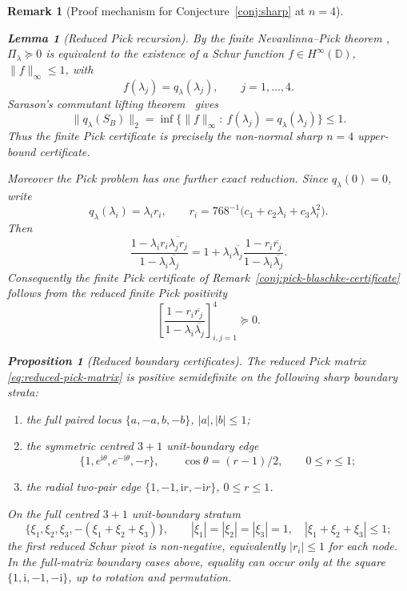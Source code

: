\documentclass[11pt]{article}
\newtheorem{proposition}[theorem]{Proposition}
\newtheorem{lemma}[theorem]{Lemma}
\newtheorem{remark}[theorem]{Remark}
\numberwithin{equation}{section}
\newcommand{\bbD}{\mathbb D}
\newcommand{\ii}{\mathrm i}
\begin{document}
\begin{remark}[Proof mechanism for Conjecture~\ref{conj:sharp} at $n=4$]
\begin{lemma}[Reduced Pick recursion]\label{lem:reduced-pick-recursion}
By the finite Nevanlinna--Pick theorem
\cite{AglMcC02,PauRag14}, \(\Pi_\lambda\succeq0\) is equivalent
to the existence of a Schur function \(f\in H^\infty(\bbD)\),
\(\|f\|_\infty\le1\), with
\[
  f(\lambda_j)=q_\lambda(\lambda_j),\qquad j=1,\ldots,4.
\]
Sarason's commutant lifting theorem~\cite{Sarason1967} gives
\[
  \|q_\lambda(S_B)\|_2
  =
  \inf\{\|f\|_\infty:\ f(\lambda_j)=q_\lambda(\lambda_j)\}\le1.
\]
Thus the finite Pick certificate is precisely the non-normal sharp
\(n=4\) upper-bound certificate.

Moreover the Pick problem has one further exact reduction.  Since
\(q_\lambda(0)=0\), write
\[
  q_\lambda(\lambda_i)=\lambda_i r_i,\qquad
  r_i=768^{-1}\bigl(c_1+c_2\lambda_i+c_3\lambda_i^2\bigr).
\]
Then
\begin{equation}\label{eq:reduced-pick-recursion}
  \frac{1-\lambda_i r_i\overline{\lambda_j r_j}}
       {1-\lambda_i\overline{\lambda_j}}
  =
  1+\lambda_i\overline{\lambda_j}
  \frac{1-r_i\overline{r_j}}
       {1-\lambda_i\overline{\lambda_j}} .
\end{equation}
Consequently the finite Pick certificate of
Remark~\ref{conj:pick-blaschke-certificate} follows from the
reduced finite Pick positivity
\begin{equation}\label{eq:reduced-pick-matrix}
  \left[
  \frac{1-r_i\overline{r_j}}{1-\lambda_i\overline{\lambda_j}}
  \right]_{i,j=1}^4\succeq0.
\end{equation}
\end{lemma}

\begin{proposition}[Reduced boundary certificates]\label{prop:reduced-boundary-certificates}
The reduced Pick matrix \eqref{eq:reduced-pick-matrix} is positive
semidefinite on the following sharp boundary strata:
\begin{enumerate}
\item the full paired locus \(\{a,-a,b,-b\}\), \(|a|,|b|\le1\);
\item the symmetric centred \(3{+}1\) unit-boundary edge
\[
  \{1,e^{\ii\theta},e^{-\ii\theta},-r\},\qquad
  \cos\theta=(r-1)/2,\qquad 0\le r\le1;
\]
\item the radial two-pair edge \(\{1,-1,\ii r,-\ii r\}\), \(0\le r\le1\).
\end{enumerate}
On the full centred \(3{+}1\) unit-boundary stratum
\[
  \{\xi_1,\xi_2,\xi_3,-(\xi_1+\xi_2+\xi_3)\},
  \qquad |\xi_1|=|\xi_2|=|\xi_3|=1,\quad
  |\xi_1+\xi_2+\xi_3|\le1;
\]
the first reduced Schur pivot is non-negative, equivalently \(|r_i|\le1\) for
each node.  In the full-matrix boundary cases above, equality can occur only
at the square
\(\{1,\ii,-1,-\ii\}\), up to rotation and permutation.
\end{proposition}


\end{remark}
\end{document}

